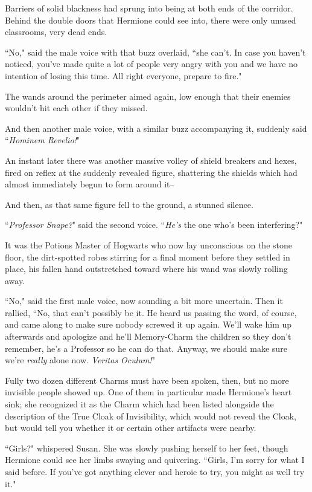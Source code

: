 Barriers of solid blackness had sprung into being at both ends of the corridor. Behind the double doors that Hermione could see into, there were only unused classrooms, very dead ends.

``No," said the male voice with that buzz overlaid, ``she can't. In case you haven't noticed, you've made quite a lot of people very angry with you and we have no intention of losing this time. All right everyone, prepare to fire."

The wands around the perimeter aimed again, low enough that their enemies wouldn't hit each other if they missed.

And then another male voice, with a similar buzz accompanying it, suddenly said ``\emph{Hominem Revelio!}"

An instant later there was another massive volley of shield breakers and hexes, fired on reflex at the suddenly revealed figure, shattering the shields which had almost immediately begun to form around it\---

And then, as that same figure fell to the ground, a stunned silence.

``\emph{Professor Snape?}" said the second voice. ``\emph{He's} the one who's been interfering?"

It was the Potions Master of Hogwarts who now lay unconscious on the stone floor, the dirt-spotted robes stirring for a final moment before they settled in place, his fallen hand outstretched toward where his wand was slowly rolling away.

``No," said the first male voice, now sounding a bit more uncertain. Then it rallied, ``No, that can't possibly be it. He heard us passing the word, of course, and came along to make sure nobody screwed it up again. We'll wake him up afterwards and apologize and he'll Memory-Charm the children so they don't remember, he's a Professor so he can do that. Anyway, we should make sure we're \emph{really} alone now. \emph{Veritas Oculum!}"

Fully two dozen different Charms must have been spoken, then, but no more invisible people showed up. One of them in particular made Hermione's heart sink; she recognized it as the Charm which had been listed alongside the description of the True Cloak of Invisibility, which would not reveal the Cloak, but would tell you whether it or certain other artifacts were nearby.

``Girls?" whispered Susan. She was slowly pushing herself to her feet, though Hermione could see her limbs swaying and quivering. ``Girls, I'm sorry for what I said before. If you've got anything clever and heroic to try, you might as well try it."


